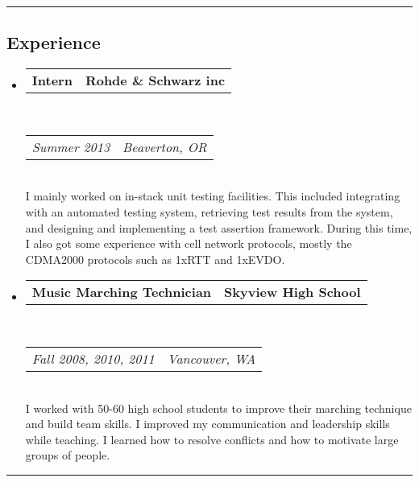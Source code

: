 \documentclass[10pt,letterpaper]{article}
\makeatletter
\newcommand{\headerrow}[2]
{\begin{tabular*}{\linewidth}{l@{\extracolsep{\fill}}r}
	#1 &
	#2 \\
\end{tabular*}}
\makeatother
\begin{document}
\hrule
\vspace{-0.4em}
\subsection*{Experience}

\begin{itemize}
	\parskip=0.1em

	\item
	\headerrow
	{\textbf{Intern}}
	{\textbf{Rohde \& Schwarz inc}}
	\\
	\headerrow
		{\emph{Summer 2013}}
		{\emph{Beaverton, OR}}
		\\
		I mainly worked on in-stack unit testing facilities. This included integrating with an automated testing system, retrieving test results from the system, and designing and implementing a test assertion framework. During this time, I also got some experience with cell network protocols, mostly the CDMA2000 protocols such as 1xRTT and 1xEVDO.
	
	\item
	\headerrow
	{\textbf{Music Marching Technician}}
	{\textbf{Skyview High School}}
	\\
	\headerrow
		{\emph{Fall 2008, 2010, 2011}}
		{\emph{Vancouver, WA}}
		\\
		I worked with 50-60 high school students to improve their marching technique and build team skills. I improved my communication and leadership skills while teaching. I learned how to resolve conflicts and how to motivate large groups of people.

\end{itemize}



\hrule
\vspace{-0.4em}
\end{document}
